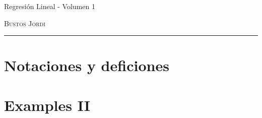 \documentclass[12pt,a4paper]{book}
\begin{document}
\renewcommand{\contentsname}{\vspace{0cm} Contenido \vspace{-2cm}}

\begin{titlepage}
\vspace*{2cm}

\noindent
\vspace*{0.5cm}

\vspace{1.5cm}
\epigraph{Regresión Lineal - Volumen 1}%
{ \textsc{Bustos Jordi}}
\null\vfill
\vspace*{1cm}
\noindent
\hfill
\begin{minipage}{0.7\linewidth}
    \begin{flushright}
        \printauthor %
    \end{flushright}
\end{minipage}
%
\begin{minipage}{0.02\linewidth}
    \rule{1pt}{70pt}
\end{minipage}
\titlepagedecoration
\end{titlepage}

\let\cleardoublepage=\clearpage
\tableofcontents
\blankpage

\chapter{Notaciones y deficiones}

\newpage\thispagestyle{empty}\blankpage

\chapter{Examples II}

\newpage\thispagestyle{empty}\blankpage


\blankpage


\nocite{*}
\end{document}
